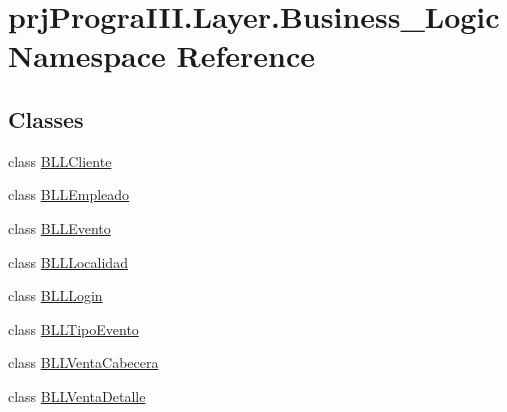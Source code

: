 \hypertarget{namespaceprj_progra_i_i_i_1_1_layer_1_1_business___logic}{}\section{prj\+Progra\+I\+I\+I.\+Layer.\+Business\+\_\+\+Logic Namespace Reference}
\label{namespaceprj_progra_i_i_i_1_1_layer_1_1_business___logic}
\subsection*{Classes}
\begin{DoxyCompactItemize}
\item 
class \hyperlink{classprj_progra_i_i_i_1_1_layer_1_1_business___logic_1_1_b_l_l_cliente}{B\+L\+L\+Cliente}
\item 
class \hyperlink{classprj_progra_i_i_i_1_1_layer_1_1_business___logic_1_1_b_l_l_empleado}{B\+L\+L\+Empleado}
\item 
class \hyperlink{classprj_progra_i_i_i_1_1_layer_1_1_business___logic_1_1_b_l_l_evento}{B\+L\+L\+Evento}
\item 
class \hyperlink{classprj_progra_i_i_i_1_1_layer_1_1_business___logic_1_1_b_l_l_localidad}{B\+L\+L\+Localidad}
\item 
class \hyperlink{classprj_progra_i_i_i_1_1_layer_1_1_business___logic_1_1_b_l_l_login}{B\+L\+L\+Login}
\item 
class \hyperlink{classprj_progra_i_i_i_1_1_layer_1_1_business___logic_1_1_b_l_l_tipo_evento}{B\+L\+L\+Tipo\+Evento}
\item 
class \hyperlink{classprj_progra_i_i_i_1_1_layer_1_1_business___logic_1_1_b_l_l_venta_cabecera}{B\+L\+L\+Venta\+Cabecera}
\item 
class \hyperlink{classprj_progra_i_i_i_1_1_layer_1_1_business___logic_1_1_b_l_l_venta_detalle}{B\+L\+L\+Venta\+Detalle}
\end{DoxyCompactItemize}
